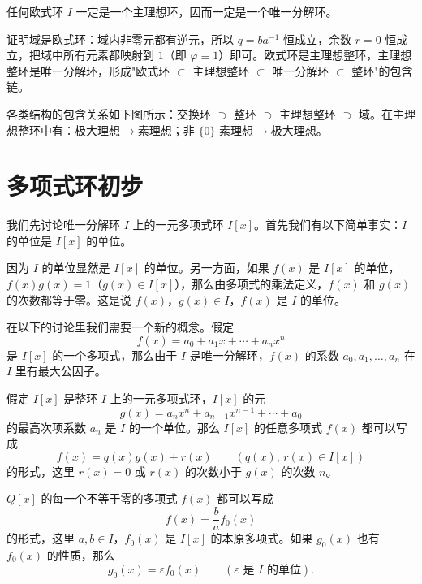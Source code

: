 \begin{theorem}[定理 1：欧式环是主理想环]
任何欧式环 $I$ 一定是一个主理想环，因而一定是一个唯一分解环。
\end{theorem}

\begin{note}[欧式环证明技巧]
证明域是欧式环：域内非零元都有逆元，所以 $q=ba^{-1}$ 恒成立，余数 $r=0$ 恒成立，把域中所有元素都映射到 $1$（即 $\varphi\equiv1$）即可。欧式环是主理想整环，主理想整环是唯一分解环，形成"欧式环 $\subset$ 主理想整环 $\subset$ 唯一分解环 $\subset$ 整环"的包含链。
\end{note}

\begin{note}[环域主理想之间的关系]
各类结构的包含关系如下图所示：交换环 $\supset$ 整环 $\supset$ 主理想整环 $\supset$ 域。在主理想整环中有：极大理想$\to$素理想；非 $\{0\}$ 素理想$\to$极大理想。
\end{note}

\section{多项式环初步}

\begin{note}[一元多项式环基础知识]
我们先讨论唯一分解环 $I$ 上的一元多项式环 $I[x]$。首先我们有以下简单事实：$I$ 的单位是 $I[x]$ 的单位。

因为 $I$ 的单位显然是 $I[x]$ 的单位。另一方面，如果 $f(x)$ 是 $I[x]$ 的单位，$f(x)g(x)=1$（$g(x)\in I[x]$），那么由多项式的乘法定义，$f(x)$ 和 $g(x)$ 的次数都等于零。这是说 $f(x)$，$g(x)\in I$，$f(x)$ 是 $I$ 的单位。

在以下的讨论里我们需要一个新的概念。假定
\[
f(x)=a_0+a_1x+\cdots+a_nx^n
\]
是 $I[x]$ 的一个多项式，那么由于 $I$ 是唯一分解环，$f(x)$ 的系数 $a_0,a_1,\ldots,a_n$ 在 $I$ 里有最大公因子。
\end{note}

\begin{lemma}[带余除法引理]
假定 $I[x]$ 是整环 $I$ 上的一元多项式环，$I[x]$ 的元
\[
g(x)=a_nx^n+a_{n-1}x^{n-1}+\cdots+a_0
\]
的最高次项系数 $a_n$ 是 $I$ 的一个单位。那么 $I[x]$ 的任意多项式 $f(x)$ 都可以写成
\[
f(x)=q(x)g(x)+r(x)\qquad(q(x),\,r(x)\in I[x])
\]
的形式，这里 $r(x)=0$ 或 $r(x)$ 的次数小于 $g(x)$ 的次数 $n$。
\end{lemma}

\begin{lemma}[引理 2：有理系数多项式的标准化]
$Q[x]$ 的每一个不等于零的多项式 $f(x)$ 都可以写成
\[
f(x)=\frac{b}{a}f_0(x)
\]
的形式，这里 $a,b\in I$，$f_0(x)$ 是 $I[x]$ 的本原多项式。如果 $g_0(x)$ 也有 $f_0(x)$ 的性质，那么
\[
g_0(x)=\varepsilon f_0(x)\qquad(\varepsilon\text{ 是 }I\text{ 的单位}).
\]
\end{lemma}


